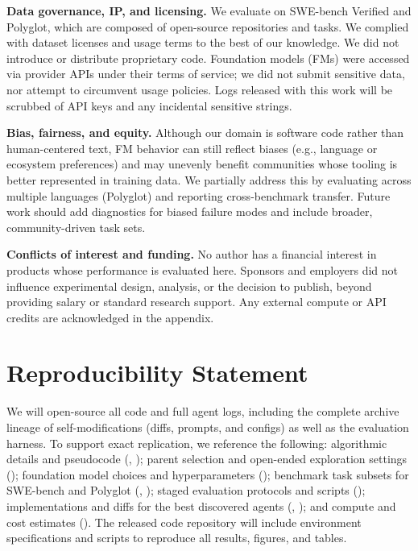 \documentclass{article}
\begin{document}
\textbf{Data governance, IP, and licensing.}
We evaluate on SWE-bench Verified and Polyglot, which are composed of open-source repositories and tasks. We complied with dataset licenses and usage terms to the best of our knowledge. We did not introduce or distribute proprietary code. Foundation models (FMs) were accessed via provider APIs under their terms of service; we did not submit sensitive data, nor attempt to circumvent usage policies. Logs released with this work will be scrubbed of API keys and any incidental sensitive strings.

\textbf{Bias, fairness, and equity.}
Although our domain is software code rather than human-centered text, FM behavior can still reflect biases (e.g., language or ecosystem preferences) and may unevenly benefit communities whose tooling is better represented in training data. We partially address this by evaluating across multiple languages (Polyglot) and reporting cross-benchmark transfer. Future work should add diagnostics for biased failure modes and include broader, community-driven task sets.

\textbf{Conflicts of interest and funding.}
No author has a financial interest in products whose performance is evaluated here. Sponsors and employers did not influence experimental design, analysis, or the decision to publish, beyond providing salary or standard research support. Any external compute or API credits are acknowledged in the appendix.


\section*{Reproducibility Statement}
We will open-source all code and full agent logs, including the complete archive lineage of self-modifications (diffs, prompts, and configs) as well as the evaluation harness. To support exact replication, we reference the following: algorithmic details and pseudocode (, ); parent selection and open-ended exploration settings (); foundation model choices and hyperparameters (); benchmark task subsets for SWE-bench and Polyglot (, ); staged evaluation protocols and scripts (); implementations and diffs for the best discovered agents (, ); and compute and cost estimates (). The released code repository will include environment specifications and scripts to reproduce all results, figures, and tables.
\end{document}
